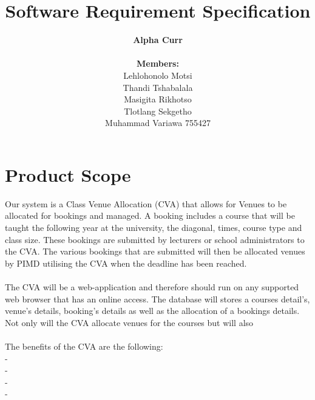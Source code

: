 \documentclass[12pt]{article}
\newenvironment{Project}[2][Project]{\begin{trivlist}
\item[\hskip \labelsep {\bfseries #1}\hskip \labelsep {\bfseries #2.}]}{\end{trivlist}}
\begin{document}
 
 
\title{\textbf{Software Requirement Specification} }
\author{\textbf{Alpha Curr}\\\\\textbf{Members:}\\Lehlohonolo Motsi \\Thandi Tshabalala \\ Masigita Rikhotso \\Tlotlang Sekgetho\\Muhammad Variawa 755427}
\maketitle
 


\begin{Project}{: Class Venue Allocation}

\end{Project}

\section{Product Scope}
Our system is a Class Venue Allocation (CVA) that allows for Venues to be allocated for bookings and managed. A booking includes a course that will be taught the following year at the university, the diagonal, times, course type and class size. These bookings are submitted by lecturers or school administrators to the CVA. The various bookings that are submitted will then be allocated venues by PIMD utilising the CVA when the deadline has been reached.\\\\
The CVA will be a web-application and therefore should run on any supported web browser that has an online access. The database will stores a courses detail's, venue's details, booking's details as well as the allocation of a bookings details. Not only will the CVA allocate venues for the courses but will also \\\\
The benefits of the CVA are the following:\\
-\\
-\\
-\\
-\\ 
\end{document}
